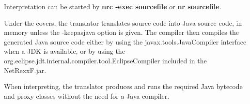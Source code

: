 Interpretation can be started by \textbf{nrc -exec sourcefile} or \textbf{nr sourcefile}.

Under the covers, the translator translates \nr{} source code into Java source code, in memory unless the -keepasjava 
option is given. The compiler then compiles the generated Java source code either by using the javax.tools.JavaCompiler interface
 when a JDK is available, or by using the \linebreak org.eclipse.jdt.internal.compiler.tool.EclipseCompiler included in the NetRexxF.jar.

When interpreting, the \nr{} translator produces and runs the required Java bytecode and proxy classes without the need for a Java compiler.

